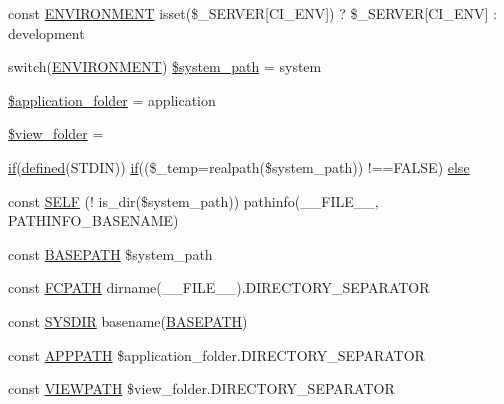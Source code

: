 \begin{DoxyCompactItemize}
\item 
const \mbox{\hyperlink{index_8php_a8757a57d09df5349f8b93b2083e29a1e}{E\+N\+V\+I\+R\+O\+N\+M\+E\+NT}} isset(\$\+\_\+\+S\+E\+R\+V\+ER\mbox{[}\textquotesingle{}C\+I\+\_\+\+E\+NV\textquotesingle{}\mbox{]}) ? \$\+\_\+\+S\+E\+R\+V\+ER\mbox{[}\textquotesingle{}C\+I\+\_\+\+E\+NV\textquotesingle{}\mbox{]} \+: \textquotesingle{}development\textquotesingle{}
\item 
switch(\mbox{\hyperlink{index_8php_a8757a57d09df5349f8b93b2083e29a1e}{E\+N\+V\+I\+R\+O\+N\+M\+E\+NT}}) \mbox{\hyperlink{index_8php_af832b0c9a5014f0bb87496701ceb30e5}{\$system\+\_\+path}} = \textquotesingle{}system\textquotesingle{}
\item 
\mbox{\hyperlink{index_8php_ace4309eda0b92e3260b226079bc17909}{\$application\+\_\+folder}} = \textquotesingle{}application\textquotesingle{}
\item 
\mbox{\hyperlink{index_8php_a974fdae9fe36c7e07e82bb71ed42b6b3}{\$view\+\_\+folder}} = \textquotesingle{}\textquotesingle{}
\item 
\mbox{\hyperlink{_code_igniter_8php_a68ca62d45495d195f67d234bdafb1d1f}{if}}(\mbox{\hyperlink{password_8php_a74f41c0efe4435fb8ac2133464d3cd57}{defined}}(\textquotesingle{}S\+T\+D\+IN\textquotesingle{})) \mbox{\hyperlink{_code_igniter_8php_a68ca62d45495d195f67d234bdafb1d1f}{if}}((\$\+\_\+temp=realpath(\$system\+\_\+path)) !==F\+A\+L\+SE) \mbox{\hyperlink{index_8php_ad6d2150d853feb0a6cb32263b584e456}{else}}
\item 
const \mbox{\hyperlink{index_8php_a6f163f65a35aa02c02a5ff21337053d8}{S\+E\+LF}} (! is\+\_\+dir(\$system\+\_\+path)) pathinfo(\+\_\+\+\_\+\+F\+I\+L\+E\+\_\+\+\_\+, P\+A\+T\+H\+I\+N\+F\+O\+\_\+\+B\+A\+S\+E\+N\+A\+ME)
\item 
const \mbox{\hyperlink{index_8php_ad39801cabfd338dc5524466fe793fda9}{B\+A\+S\+E\+P\+A\+TH}} \$system\+\_\+path
\item 
const \mbox{\hyperlink{index_8php_ae486546e58b2603595efedf9f95b3926}{F\+C\+P\+A\+TH}} dirname(\+\_\+\+\_\+\+F\+I\+L\+E\+\_\+\+\_\+).D\+I\+R\+E\+C\+T\+O\+R\+Y\+\_\+\+S\+E\+P\+A\+R\+A\+T\+OR
\item 
const \mbox{\hyperlink{index_8php_ab645ae0961792b1f2b4b83f89cb95fa5}{S\+Y\+S\+D\+IR}} basename(\mbox{\hyperlink{index_8php_ad39801cabfd338dc5524466fe793fda9}{B\+A\+S\+E\+P\+A\+TH}})
\item 
const \mbox{\hyperlink{index_8php_a644e58bbe10b41e25c0768345587f4aa}{A\+P\+P\+P\+A\+TH}} \$application\+\_\+folder.\+D\+I\+R\+E\+C\+T\+O\+R\+Y\+\_\+\+S\+E\+P\+A\+R\+A\+T\+OR
\item 
const \mbox{\hyperlink{index_8php_ade8921d52af58583e5727833459224c3}{V\+I\+E\+W\+P\+A\+TH}} \$view\+\_\+folder.\+D\+I\+R\+E\+C\+T\+O\+R\+Y\+\_\+\+S\+E\+P\+A\+R\+A\+T\+OR
\end{DoxyCompactItemize}


